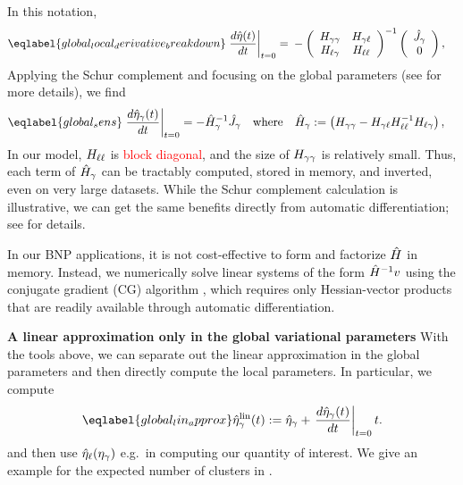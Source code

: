 In this notation,
%
\begin{align} \eqlabel{global_local_derivative_breakdown}
%
\fracat{d \etaopt(\t)}{d \t}{t = 0} ={}&
-\left(
\begin{array}{cc}
   \hess{\gamma\gamma} & \hess{\gamma\ell} \\
   \hess{\ell\gamma}     & \hess{\ell\ell} \\
\end{array}
\right)^{-1}
\left( \begin{array}{c} \crosshessian_\gamma \\ 0 \end{array}\right),
%
\end{align}
%
Applying the Schur complement and focusing on the global parameters (see  for more details), we find
%
\begin{align}\eqlabel{global_sens}
  \fracat{d \etaopt_\gamma(\t)}{d \t}{t = 0} &=
  - \hessopt_\gamma^{-1}\crosshessian_\gamma
  \mathwhere
  \hessopt_\gamma := \left(\hess{\gamma\gamma} -
        \hess{\gamma\ell} \hess{\ell\ell}^{-1} \hess{\ell\gamma}\right),
\end{align}
%
In our model, $H_{\ell\ell}$ is \textcolor{red}{block diagonal}, and the size of $H_{\gamma\gamma}$
is relatively small. Thus, each term of $\hat{H}_\gamma$ can be tractably
computed, stored in memory, and inverted, even on very large datasets.
While the Schur complement calculation is illustrative, we can get the same benefits directly from automatic differentiation; see  for details.

In our BNP applications, it is not cost-effective to form and factorize
$\hat{H}$ in memory.  Instead, we numerically solve linear systems of the form
$\hat{H}^{-1} v$ using the conjugate gradient (CG) algorithm \citep[Chapter
5]{nocedal:2006:numerical}, which requires only Hessian-vector products that
are readily available through automatic differentiation.

\noindent \textbf{A linear approximation only in the global variational parameters}
%
With the tools above, we can separate out the linear approximation in the global parameters
and then directly compute the local parameters. In particular,
we compute
%
\begin{align}\eqlabel{global_lin_approx}
  \etalin_\gamma(\t) := \etaopt_\gamma +
  \fracat{d \etaopt_\gamma(\t)}{d \t}{\t=0} \t .
\end{align}
%
and then use $\hat\eta_{\ell}(\eta_{\gamma})$ e.g.\ in computing our quantity of interest.
We give an example for the expected number of clusters in
.
